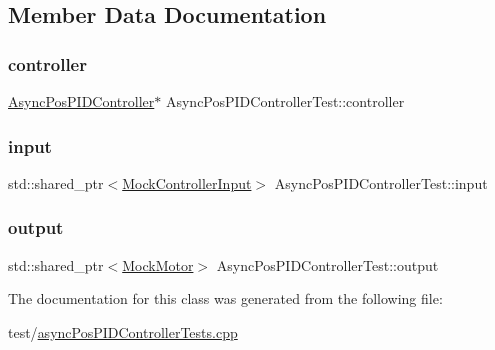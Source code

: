 \subsection{Member Data Documentation}
\mbox{\label{classAsyncPosPIDControllerTest_afa02457d6de919f45f2a72ee11db3aee}} 
\subsubsection{\texorpdfstring{controller}{controller}}
{\footnotesize\ttfamily \mbox{\hyperlink{classokapi_1_1AsyncPosPIDController}{Async\+Pos\+P\+I\+D\+Controller}}$\ast$ Async\+Pos\+P\+I\+D\+Controller\+Test\+::controller\hspace{0.3cm}{\ttfamily [protected]}}

\mbox{\label{classAsyncPosPIDControllerTest_ade8dfb0e763f75f2013fa450a58bfac4}} 
\subsubsection{\texorpdfstring{input}{input}}
{\footnotesize\ttfamily std\+::shared\+\_\+ptr$<$\mbox{\hyperlink{classokapi_1_1MockControllerInput}{Mock\+Controller\+Input}}$>$ Async\+Pos\+P\+I\+D\+Controller\+Test\+::input\hspace{0.3cm}{\ttfamily [protected]}}

\mbox{\label{classAsyncPosPIDControllerTest_a27e472ee9e99191880c195e6951d6d4b}} 
\subsubsection{\texorpdfstring{output}{output}}
{\footnotesize\ttfamily std\+::shared\+\_\+ptr$<$\mbox{\hyperlink{classokapi_1_1MockMotor}{Mock\+Motor}}$>$ Async\+Pos\+P\+I\+D\+Controller\+Test\+::output\hspace{0.3cm}{\ttfamily [protected]}}



The documentation for this class was generated from the following file\+:\begin{DoxyCompactItemize}
\item 
test/\mbox{\hyperlink{asyncPosPIDControllerTests_8cpp}{async\+Pos\+P\+I\+D\+Controller\+Tests.\+cpp}}\end{DoxyCompactItemize}
